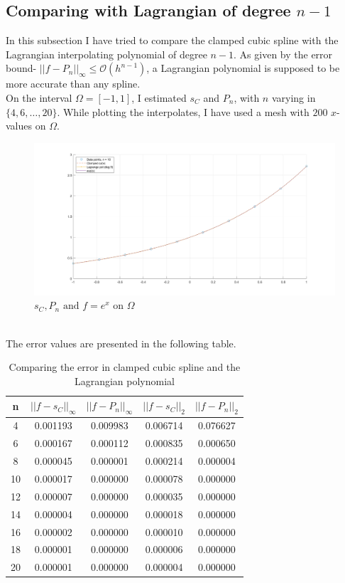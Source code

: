 \documentclass[12pt]{article}
\begin{document}
\subsection{Comparing with Lagrangian of degree $n-1$}
In this subsection I have tried to compare the clamped cubic spline with the Lagrangian interpolating polynomial of degree $n-1$. As given by the error bound- $||f-P_n||_\infty \leq \mathcal{O}(h^{n-1})$, a Lagrangian polynomial is supposed to be more accurate than any spline.\\
On the interval $\Omega = [-1,1]$, I estimated $s_C$ and $P_n$, with $n$ varying in $\{4, 6, \dots, 20\}$. While plotting the interpolates, I have used a mesh with $200$ $x$-values on $\Omega$.
\begin{figure}[h]
    \centering
    \includegraphics[scale = 0.25]{clmp_lag.png}
    \caption{$s_C, P_n \text{ and } f = e^x$ on $\Omega$}
\end{figure}
\\The error values are presented in the following table.
\begin{table}[h]
    \centering
    \begin{tabular}{|c|c|c|c|c|}
        \hline
        n & $||f-s_C||_\infty$ & $||f-P_n||_\infty$
        & $||f-s_C||_2$ & $||f-P_n||_2$\\
        \hline \hline
        4 & 0.001193 & 0.009983 & 0.006714 & 0.076627\\
        \hline
        6 & 0.000167 & 0.000112 & 0.000835 & 0.000650\\
        \hline
        8 & 0.000045 & 0.000001 & 0.000214 & 0.000004\\
        \hline
        10 & 0.000017 & 0.000000 & 0.000078 & 0.000000\\
        \hline
        12 & 0.000007 & 0.000000 & 0.000035 & 0.000000\\
        \hline
        14 & 0.000004 & 0.000000 & 0.000018 & 0.000000\\
        \hline
        16 & 0.000002 & 0.000000 & 0.000010 & 0.000000\\
        \hline
        18 & 0.000001 & 0.000000 & 0.000006 & 0.000000\\
        \hline
        20 & 0.000001 & 0.000000 & 0.000004 & 0.000000\\
        \hline
    \end{tabular}
    \caption{Comparing the error in clamped cubic spline and the Lagrangian polynomial}
\end{table}
\end{document}
